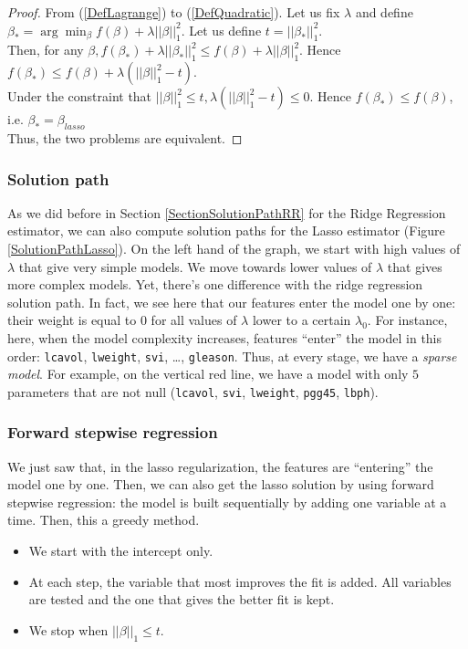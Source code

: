 \documentclass[a4paper,12pt]{article}
\begin{document}
\begin{proof}
From (\ref{DefLagrange}) to (\ref{DefQuadratic}). Let us fix $\lambda$ and define $\beta_*  = \arg \min_\beta f(\beta) + \lambda ||\beta||_1^2$. Let us define $t = ||\beta_*||_1^2.$\\ 
Then, for any $\beta, f(\beta_*)+ \lambda ||\beta_*||_1^2 \leq f(\beta)+\lambda||\beta||_1^2$. Hence $f(\beta_*)\leq f(\beta)+\lambda(||\beta||_1^2 - t).$\\
Under the constraint that $||\beta||_1^2 \leq t, \lambda(||\beta||_1^2 - t) \leq 0$. Hence $f(\beta_*) \leq f(\beta)$, i.e. $\beta_* = \beta_{lasso}$\\

Thus, the two problems are equivalent.
\end{proof}
\subsubsection{Solution path}
As we did before in Section \ref{SectionSolutionPathRR} for the Ridge Regression estimator, we can also compute solution paths for the Lasso estimator (Figure \ref{SolutionPathLasso}). On the left hand of the graph, we start with high values of $\lambda$ that give very simple models. We move towards lower values of $\lambda$ that gives more complex models. Yet, there's one difference with the ridge regression solution path. In fact, we see here that our features enter the model one by one: their weight is equal to $0$ for all values of $\lambda$ lower to a certain $\lambda_0$. For instance, here, when the model complexity increases, features ``enter'' the model in this order: \texttt{lcavol}, \texttt{lweight}, \texttt{svi}, \ldots, \texttt{gleason}. Thus, at every stage, we have a \emph{sparse model}. For example, on the vertical red line, we have a model with only $5$ parameters that are not null (\texttt{lcavol}, \texttt{svi}, \texttt{lweight}, \texttt{pgg45}, \texttt{lbph}).

\subsubsection{Forward stepwise regression}
We just saw that, in the lasso regularization, the features are ``entering'' the model one by one. Then, we can also get the lasso solution by using forward stepwise regression: the model is built sequentially by adding one variable at a time. Then, this a greedy method.
\begin{itemize}
\item We start with the intercept only.
\item At each step, the variable that most improves the fit is added. All variables are tested and the one that gives the better fit is kept.
\item We stop when $||\beta ||_1 \leq t$.
\end{itemize}
\end{document}
